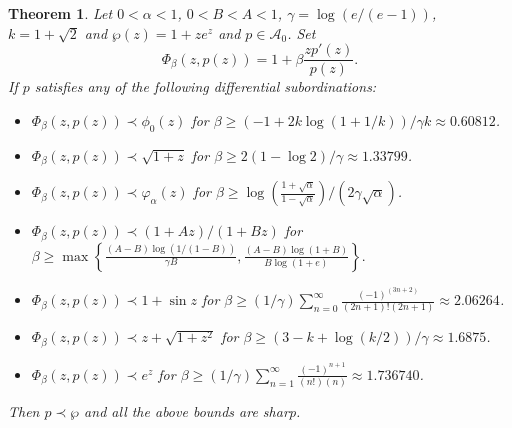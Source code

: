 \documentclass[12pt, reqno]{amsart}
\numberwithin{equation}{section}
\theoremstyle{plain}
\newtheorem{theorem}{Theorem}[section]
\theoremstyle{definition}
\theoremstyle{remark}
\begin{document}

\begin{theorem}\label{sb2}
	Let $0<\alpha<1$, $0<B<A<1$, $\gamma=\log(e/(e-1))$, $k=1+\sqrt{2}$ and $\wp(z)=1+ze^z$ and $p\in \mathcal{A}_{0}$. Set
	\begin{equation*}
	\Phi_\beta(z, p(z))=1+\beta\frac{zp'(z)}{p(z)}.
	\end{equation*}  
	If $p$ satisfies any of the following differential subordinations: 	
	\begin{itemize}
		\item [$(i)$] $\Phi_\beta(z, p(z)) \prec \phi_0(z)$ for $\beta\geq (-1+2k\log(1+1/k))/\gamma k \approx0.60812$.
		\item [$(ii)$] $\Phi_\beta(z, p(z)) \prec \sqrt{1+z}$ for $\beta \geq 2(1-\log{2})/\gamma\approx 1.33799$.
		\item [$(iii)$] $\Phi_\beta(z, p(z)) \prec \varphi_\alpha(z)$ for $\beta\geq  \log(\frac{1+\sqrt{\alpha}}{1-\sqrt{\alpha}})/(2\gamma\sqrt{\alpha})$.
		\item [$(iv)$] $\Phi_\beta(z, p(z)) \prec (1+Az)/(1+Bz)$ for $\beta \geq \max\left\{\frac{(A-B)\log(1/(1-B))}{\gamma B}, \frac{(A-B)\log(1+B)}{B\log(1+e)}\right\}.$
		\item [$(v)$] $\Phi_\beta(z, p(z)) \prec 1+\sin{z}$ for $\beta \geq (1/\gamma)\sum_{n=0}^{\infty}\frac{(-1)^(3n+2)}{(2n+1)!(2n+1)}\approx2.06264$.
		\item [$(vi)$] $\Phi_\beta(z, p(z)) \prec z+\sqrt{1+z^2}$ for $\beta\geq (3-k+\log{(k/2)})/\gamma\approx1.6875$.
		\item [$(vii)$] $\Phi_\beta(z, p(z)) \prec e^z$ for $\beta\geq (1/\gamma)\sum_{n=1}^{\infty}\frac{(-1)^{n+1}}{(n!)(n)}\approx1.736740$.
	\end{itemize}
	Then $p \prec \wp$ and all the above bounds are sharp. 
\end{theorem}
\end{document}
